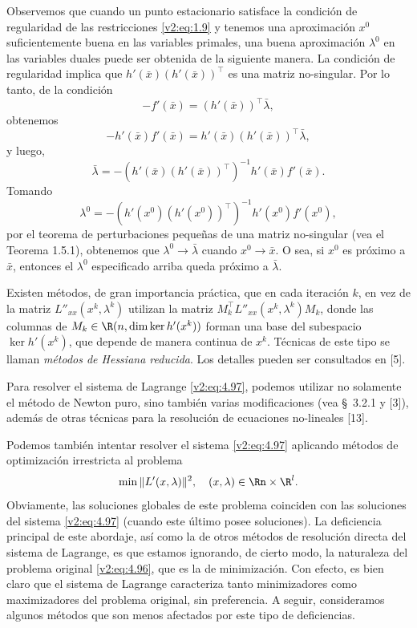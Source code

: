 Observemos que cuando un punto estacionario satisface la condición de regularidad de las restricciones \eqref{v2:eq:1.9} y tenemos una aproximación $x^0$ suficientemente buena en las variables primales, una buena aproximación $\lambda^0$ en las variables duales puede ser obtenida de la siguiente manera. La condición de regularidad implica que $h'(\bar{x})(h'(\bar{x}))^\top$ es una matriz no-singular. Por lo tanto, de la condición
\[
    -f'(\bar{x}) = (h'(\bar{x}))^\top \bar{\lambda},
\]
obtenemos
\[
    -h'(\bar{x})f'(\bar{x}) = h'(\bar{x})(h'(\bar{x}))^\top \bar{\lambda},
\]
y luego,
\[
    \bar{\lambda} = -(h'(\bar{x})(h'(\bar{x}))^\top)^{-1} h'(\bar{x})f'(\bar{x}).
\]
Tomando
\[
    \lambda^0 = -(h'(x^0)(h'(x^0))^\top)^{-1} h'(x^0)f'(x^0),
\]
por el teorema de perturbaciones pequeñas de una matriz no-singular (vea el Teorema 1.5.1), obtenemos que $\lambda^0 \to \bar{\lambda}$ cuando $x^0 \to \bar{x}$. O sea, si $x^0$ es próximo a $\bar{x}$, entonces el $\lambda^0$ especificado arriba queda próximo a $\bar{\lambda}$.

Existen métodos, de gran importancia práctica, que en cada iteración $k$, en vez de la matriz $L''_{xx}(x^k, \lambda^k)$ utilizan la matriz $M_k^\top L''_{xx}(x^k, \lambda^k) M_k$, donde las columnas de $M_k \in \R(n, \dim \ker h'(x^k))$ forman una base del subespacio $\ker h'(x^k)$, que depende de manera continua de $x^k$. Técnicas de este tipo se llaman \textit{métodos de Hessiana reducida}. Los detalles pueden ser consultados en [5].

Para resolver el sistema de Lagrange \eqref{v2:eq:4.97}, podemos utilizar no solamente el método de Newton puro, sino también varias modificaciones (vea \S~3.2.1 y [3]), además de otras técnicas para la resolución de ecuaciones no-lineales [13].

Podemos también intentar resolver el sistema \eqref{v2:eq:4.97} aplicando métodos de optimización irrestricta al problema
\begin{equation}
    \min \|L'(x, \lambda)\|^2, \quad (x, \lambda) \in \Rn \times \R^l.
    \label{v2:eq:4.103}
\end{equation}
Obviamente, las soluciones globales de este problema coinciden con las soluciones del sistema \eqref{v2:eq:4.97} (cuando este último posee soluciones). La deficiencia principal de este abordaje, así como la de otros métodos de resolución directa del sistema de Lagrange, es que estamos ignorando, de cierto modo, la naturaleza del problema original \eqref{v2:eq:4.96}, que es la de minimización. Con efecto, es bien claro que el sistema de Lagrange caracteriza tanto minimizadores como maximizadores del problema original, sin preferencia. A seguir, consideramos algunos métodos que son menos afectados por este tipo de deficiencias.

